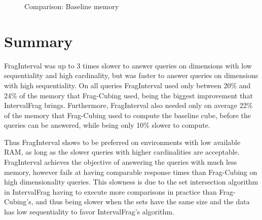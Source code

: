 \begin{figure}[H]
  \caption{Comparison: Baseline memory}\label{fig:interval:baseline}
  \vspace{6mm}
  \begin{center}
  \end{center}
  \vspace{2mm}
\end{figure}

\section{Summary}\label{ch:interval:summary}

FragInterval was up to 3 times slower to answer queries on dimensions with low sequentiality and high cardinality, but was faster to answer queries on dimensions with high sequentiality.
On all queries FragInterval used only between 20\% and 24\% of the memory that Frag-Cubing used, being the biggest improvement that IntervalFrag brings.
Furthermore, FragInterval also needed only on average 22\% of the memory that Frag-Cubing used to compute the baseline cube, before the queries can be answered, while being only 10\% slower to compute.

Thus FragInterval shows to be preferred on environments with low available RAM, as long as the slower queries with higher cardinalities are acceptable.
FragInterval achieves the objective of answering the queries with much less memory, however fails at having comparable response times than Frag-Cubing on high dimensionality queries.
This slowness is due to the set intersection algorithm in IntervalFrag having to execute more comparisons in practice than Frag-Cubing's, and thus being slower when the sets have the same size and the data has low sequentiality to favor IntervalFrag's algorithm.

